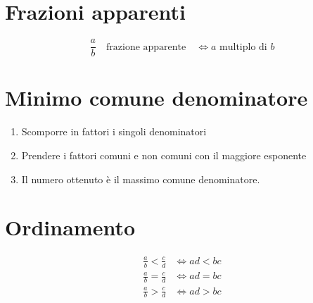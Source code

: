 \section{Frazioni apparenti}
\begin{equation}
\dfrac{a}{b}\quad\text{frazione apparente}\quad\Longleftrightarrow\text{$a$ multiplo di $b$}
\end{equation}
\section{Minimo comune denominatore}
\begin{enumerate}
	\item Scomporre in fattori i singoli denominatori
	\item Prendere i fattori comuni e non comuni con il maggiore esponente
	\item Il  numero ottenuto è il massimo comune denominatore.
\end{enumerate}
\section{Ordinamento}
\begin{align}
\frac{a}{b}<\frac{c}{d} &\Longleftrightarrow ad<bc\\
\frac{a}{b}=\frac{c}{d} &\Longleftrightarrow ad=bc\\
\frac{a}{b}>\frac{c}{d} &\Longleftrightarrow ad>bc
\end{align}
